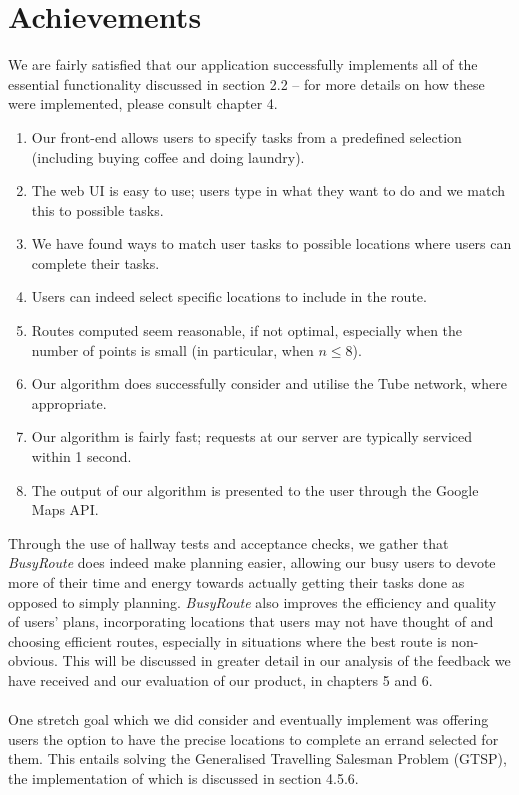 \documentclass[a4paper, 10pt]{report}
\begin{document}
\section{Achievements}
We are fairly satisfied that our application successfully implements all of the essential functionality discussed in section 2.2 -- for more details on how these were implemented, please consult chapter 4.
\begin{enumerate}
\item Our front-end allows users to specify tasks from a predefined selection (including buying coffee and doing laundry).
\item The web UI is easy to use; users type in what they want to do and we match this to possible tasks.
\item We have found ways to match user tasks to possible locations where users can complete their tasks.
\item Users can indeed select specific locations to include in the route.
\item Routes computed seem reasonable, if not optimal, especially when the number of points is small (in particular, when $n \leq 8$).
\item Our algorithm does successfully consider and utilise the Tube network, where appropriate.
\item Our algorithm is fairly fast; requests at our server are typically serviced within 1 second.
\item The output of our algorithm is presented to the user through the Google Maps API.
\end{enumerate}
Through the use of hallway tests and acceptance checks, we gather that \textit{BusyRoute} does indeed make planning easier, allowing our busy users to devote more of their time and energy towards actually getting their tasks done as opposed to simply planning. \textit{BusyRoute} also improves the efficiency and quality of users' plans, incorporating locations that users may not have thought of and choosing efficient routes, especially in situations where the best route is non-obvious. This will be discussed in greater detail in our analysis of the feedback we have received and our evaluation of our product, in chapters 5 and 6.\\
\\
One stretch goal which we did consider and eventually implement was offering users the option to have the precise locations to complete an errand selected for them. This entails solving the Generalised Travelling Salesman Problem (GTSP), the implementation of which is discussed in section 4.5.6.
\end{document}
